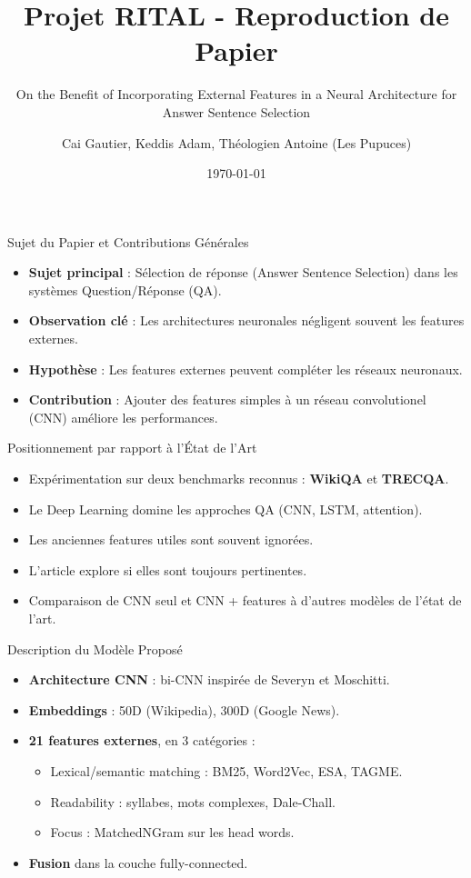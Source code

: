 \documentclass{beamer}
\title{Projet RITAL - Reproduction de Papier}
\subtitle{On the Benefit of Incorporating External Features in a Neural Architecture for Answer Sentence Selection}
\author{Cai Gautier, Keddis Adam, Théologien Antoine (Les Pupuces)}
\date{\today}
\begin{document}
\begin{frame}
  \titlepage
\end{frame}

\begin{frame}{Sujet du Papier et Contributions Générales}
  \begin{itemize}
    \item \textbf{Sujet principal} : Sélection de réponse (Answer Sentence Selection) dans les systèmes Question/Réponse (QA).
    \item \textbf{Observation clé} : Les architectures neuronales négligent souvent les features externes.
    \item \textbf{Hypothèse} : Les features externes peuvent compléter les réseaux neuronaux.
    \item \textbf{Contribution} : Ajouter des features simples à un réseau convolutionel  (CNN) améliore les performances.
  \end{itemize}
\end{frame}

\begin{frame}{Positionnement par rapport à l'État de l'Art}
  \begin{itemize}
    \item Expérimentation sur deux benchmarks reconnus : \textbf{WikiQA} et \textbf{TRECQA}.
    \item Le Deep Learning domine les approches QA (CNN, LSTM, attention).
    \item Les anciennes features utiles sont souvent ignorées.
    \item L'article explore si elles sont toujours pertinentes.
    \item Comparaison de CNN seul et CNN + features à d'autres modèles de l'état de l'art.
  \end{itemize}
\end{frame}

\begin{frame}{Description du Modèle Proposé}
  \begin{itemize}
    \item \textbf{Architecture CNN} : bi-CNN inspirée de Severyn et Moschitti.
    \item \textbf{Embeddings} : 50D (Wikipedia), 300D (Google News).
    \item \textbf{21 features externes}, en 3 catégories :
    \begin{itemize}
      \item Lexical/semantic matching : BM25, Word2Vec, ESA, TAGME.
      \item Readability : syllabes, mots complexes, Dale-Chall.
      \item Focus : MatchedNGram sur les head words.
    \end{itemize}
    \item \textbf{Fusion} dans la couche fully-connected.
  \end{itemize}
\end{frame}
\end{document}
